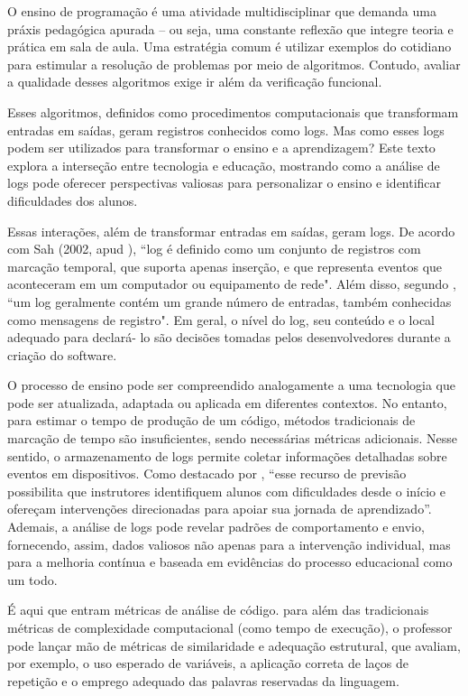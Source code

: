 O ensino de programação é uma atividade multidisciplinar que demanda uma práxis pedagógica apurada -- ou seja, 
uma constante reflexão que integre teoria e prática em sala de aula. Uma estratégia comum é utilizar exemplos 
do cotidiano para estimular a resolução de problemas por meio de algoritmos. Contudo, avaliar a qualidade  
desses algoritmos exige ir além da verificação funcional. 

Esses algoritmos, definidos como procedimentos computacionais que transformam entradas em saídas, geram 
registros conhecidos como logs. Mas como esses logs podem ser utilizados para transformar o ensino e a 
aprendizagem? Este texto explora a interseção entre tecnologia e educação, mostrando como a análise de logs 
pode oferecer perspectivas valiosas para personalizar o ensino e identificar dificuldades dos alunos.

Essas interações, além de transformar entradas em saídas, geram logs. De acordo com Sah (2002, apud 
\cite{clemente2008arquitetura}), ``log é definido como um conjunto de registros com marcação temporal, que 
suporta apenas inserção, e que representa eventos que aconteceram em um computador ou equipamento de rede". 
Além disso, segundo \cite{gu2022logging}, ``um log geralmente contém um grande número de entradas, também 
conhecidas como mensagens de registro". Em geral, o nível do log, seu conteúdo e o local adequado para declará-
lo são decisões tomadas pelos desenvolvedores durante a criação do software.

O processo de ensino pode ser compreendido analogamente a uma tecnologia que pode ser atualizada, adaptada ou 
aplicada em diferentes contextos. No entanto, para estimar o tempo de produção de um código, métodos 
tradicionais de marcação de tempo são insuficientes, sendo necessárias métricas adicionais. Nesse sentido, o 
armazenamento de logs permite coletar informações detalhadas sobre eventos em dispositivos. Como destacado por 
\cite{nguyen_analyzing_2023}, ``esse recurso de previsão possibilita que instrutores identifiquem alunos com 
dificuldades desde o início e ofereçam intervenções direcionadas para apoiar sua jornada de aprendizado''. 
Ademais, a análise de logs pode revelar padrões de comportamento e envio, fornecendo, assim,  dados valiosos 
não apenas para a intervenção individual, mas para a melhoria contínua  e baseada em evidências do processo 
educacional como um todo.

É aqui que entram métricas de análise de código. para além das tradicionais métricas de complexidade 
computacional (como tempo de execução), o professor pode lançar mão de métricas de similaridade e 
adequação estrutural, que avaliam, por exemplo, o uso esperado de variáveis, a aplicação correta de laços de 
repetição e o emprego adequado das palavras reservadas da linguagem. 

